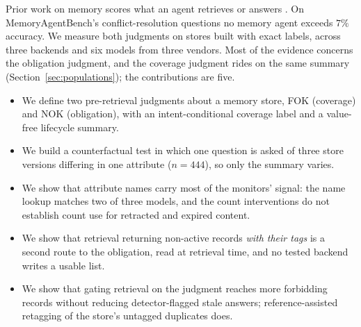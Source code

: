 \documentclass{article}
\begin{document}
Prior work on memory scores what an agent retrieves or answers \citep{longmemeval,locomo,memoryagentbench,stale}.
On MemoryAgentBench's conflict-resolution questions no memory agent exceeds $7\%$ accuracy.
We measure both judgments on stores built with exact labels, across three backends and six models from three vendors.
Most of the evidence concerns the obligation judgment, and the coverage judgment rides on the same summary (Section~\ref{sec:populations}); the contributions are five.
\begin{itemize}\setlength{\itemsep}{1pt}
\item We define two pre-retrieval judgments about a memory store, FOK (coverage) and NOK (obligation), with an intent-conditional coverage label and a value-free lifecycle summary.
\item We build a counterfactual test in which one question is asked of three store versions differing in one attribute ($n=444$), so only the summary varies.
\item We show that attribute names carry most of the monitors' signal: the name lookup matches two of three models, and the count interventions do not establish count use for retracted and expired content.
\item We show that retrieval returning non-active records \emph{with their tags} is a second route to the obligation, read at retrieval time, and no tested backend writes a usable list.
\item We show that gating retrieval on the judgment reaches more forbidding records without reducing detector-flagged stale answers; reference-assisted retagging of the store's untagged duplicates does.
\end{itemize}
\end{document}
